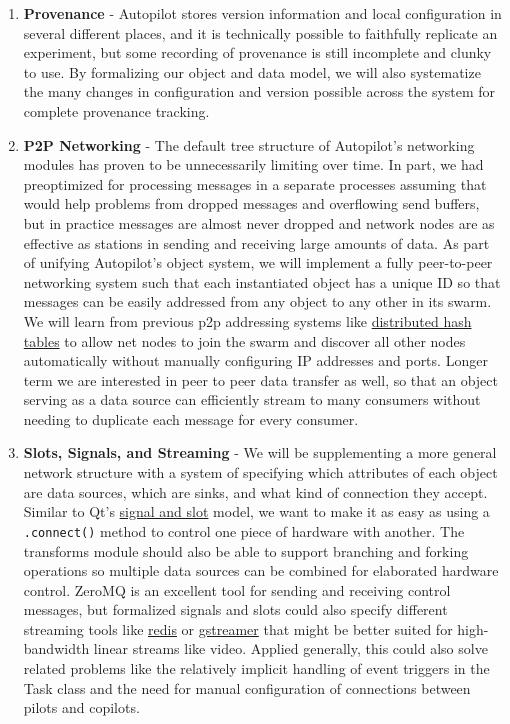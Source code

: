 \begin{enumerate}[ref=\thechapter.\arabic*]
    \item \label{future:provenance}\textbf{Provenance} - Autopilot stores version information and local configuration in several different places, and it is technically possible to faithfully replicate an experiment, but some recording of provenance is still incomplete and clunky to use. By formalizing our object and data model, we will also systematize the many changes in configuration and version possible across the system for complete provenance tracking.
    \item \label{future:network}\textbf{P2P Networking} - The default tree structure of Autopilot's networking modules has proven to be unnecessarily limiting over time. In part, we had preoptimized for processing messages in a separate processes assuming that would help problems from dropped messages and overflowing send buffers, but in practice messages are almost never dropped and network nodes are as effective as stations in sending and receiving large amounts of data. As part of unifying Autopilot's object system, we will implement a fully peer-to-peer networking system such that each instantiated object has a unique ID so that messages can be easily addressed from any object to any other in its swarm. We will learn from previous p2p addressing systems like \href{https://en.wikipedia.org/wiki/Distributed\_hash\_table}{distributed hash tables} to allow net nodes to join the swarm and discover all other nodes automatically without manually configuring IP addresses and ports. Longer term we are interested in peer to peer data transfer as well, so that an object serving as a data source can efficiently stream to many consumers without needing to duplicate each message for every consumer.
    \item \label{future:slots}\textbf{Slots, Signals, and Streaming} - We will be supplementing a more general network structure with a system of specifying which attributes of each object are data sources, which are sinks, and what kind of connection they accept. Similar to Qt's \href{https://doc.qt.io/qt-6/signalsandslots.html}{signal and slot} model, we want to make it as easy as using a \texttt{.connect()} method to control one piece of hardware with another. The transforms module should also be able to support branching and forking operations so multiple data sources can be combined for elaborated hardware control. ZeroMQ is an excellent tool for sending and receiving control messages, but formalized signals and slots could also specify different streaming tools like \href{https://redis.io/}{redis} or \href{https://gstreamer.freedesktop.org/}{gstreamer} that might be better suited for high-bandwidth linear streams like video. Applied generally, this could also solve related problems like the relatively implicit handling of event triggers in the Task class and the need for manual configuration of connections between pilots and copilots.

\end{enumerate}

